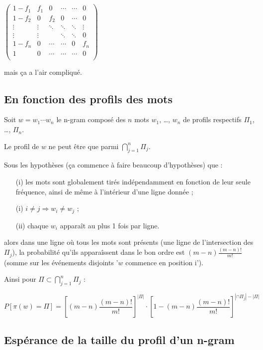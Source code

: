 \documentclass{article}
\begin{document}
$\begin{pmatrix}
   1-f_1 & f_1 & 0 & \cdots & \cdots & 0 \\
   1-f_2 & 0 & f_2 & 0 & \cdots & 0 \\
   \vdots & \vdots & \ddots & \ddots & \ddots & \vdots \\
   \vdots & \vdots &  & \ddots & \ddots  & 0 \\
   1-f_n & 0 & \cdots & \cdots & 0 & f_n \\
   1 & 0 & \cdots & \cdots & \cdots & 0 \\
\end{pmatrix}$

mais ça a l'air compliqué.


\subsection{En fonction des profils des mots}

Soit $w=w_1 \cdots w_n$ le n-gram composé des $n$ mots $w_1$, \dots , $w_n$ de profils respectifs $\Pi_1$, \dots , $\Pi_n$.

Le profil de $w$ ne peut être que parmi $\bigcap_{j=1}^{n}\Pi_j$.

Sous les hypothèses (ça commence à faire beaucoup d'hypothèses) que :

\begin{itemize}
	\item[(i)] les mots sont globalement tirés indépendamment en fonction de leur seule fréquence, ainsi de même à l'intérieur d'une ligne donnée ;
	\item[(i)] $i \neq j \Rightarrow w_i \neq w_j$ ;
	\item[(ii)] chaque $w_i$ apparaît au plus 1 fois par ligne.
\end{itemize}

alors dans une ligne où tous les mots sont présents (une ligne de l'intersection des $\Pi_j$), la probabilité qu'ils apparaîssent dans le bon ordre est $(m-n)\frac{(m-n)!}{m!}$ (somme sur les événements disjoints '$w$ commence en position i').

Ainsi pour $\Pi\subset\bigcap_{j=1}^n\Pi_j$ :

\begin{equation}
	P[\pi(w)=\Pi] =
		\left[(m-n)\frac{(m-n)!}{m!}\right]^{|\Pi|}\cdot
		\left[1-(m-n)\frac{(m-n)!}{m!}\right]^{|\cap\Pi_j|-|\Pi|}
\end{equation}


\subsection{Espérance de la taille du profil d'un n-gram}
\end{document}
